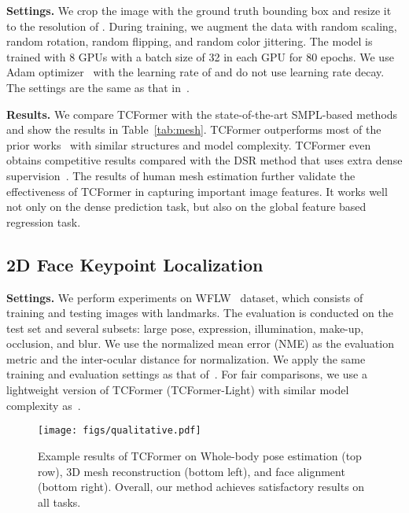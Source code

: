 \documentclass[10pt,twocolumn,letterpaper]{article}
\begin{document}
\textbf{Settings.} 
We crop the image with the ground truth bounding box and resize it to the resolution of . During training, we augment the data with random scaling, random rotation, random flipping, and random color jittering. 
The model is trained with 8 GPUs with a batch size of 32 in each GPU for 80 epochs. We use Adam optimizer~\cite{kingma2014adam} with the learning rate of  and do not use learning rate decay. 
The settings are the same as that in~\cite{joo2020exemplar,dwivedi2021learning}.






\textbf{Results.} 
We compare TCFormer with the state-of-the-art SMPL-based methods and show the results in Table~\ref{tab:mesh}. TCFormer outperforms most of the prior works~\cite{kanazawa2018end,kolotouros2019learning,zanfir2020weakly,joo2020exemplar}
with similar structures and model complexity.
TCFormer even obtains competitive results compared with the DSR method that uses extra dense supervision~\cite{dwivedi2021learning}. 
The results of human mesh estimation further validate the effectiveness of TCFormer in capturing important image features. It works well not only on the dense prediction task, but also on the global feature based regression task.





\subsection{2D Face Keypoint Localization}

\textbf{Settings.}
We perform experiments on WFLW~\cite{wu2018look} dataset, which consists of  training and  testing images with  landmarks. The evaluation is conducted on the test set and several subsets: large pose, expression, illumination, make-up, occlusion, and blur.
We use the normalized mean error (NME) as the evaluation metric and the inter-ocular distance for normalization. 
We apply the same training and evaluation settings as that of~\cite{wang2020deep}.
For fair comparisons, we use a lightweight version of TCFormer (TCFormer-Light) with similar model complexity as~\cite{wang2020deep}.



\begin{figure*}[t]
	\centering
	\texttt{[image: figs/qualitative.pdf]}
	\vspace{-5pt}
	\caption{
	Example results of TCFormer on Whole-body pose estimation (top row), 3D mesh reconstruction (bottom left), and face alignment (bottom right). Overall, our method achieves satisfactory results on all tasks.
	}
	\label{fig:qualitative}
	\vspace{-7pt}
\end{figure*}
\end{document}
